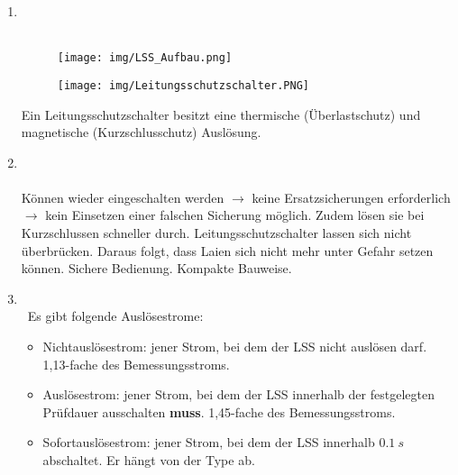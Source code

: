 \begin{enumerate}
    \clearpage


    \item   {}\\\\

            \begin{figure}[!htp]
                \centering
                \texttt{[image: img/LSS\_Aufbau.png]}
            \end{figure}
            \begin{figure}[!htp]
                \centering
                \texttt{[image: img/Leitungsschutzschalter.PNG]}
            \end{figure}

            Ein Leitungsschutzschalter besitzt eine thermische (Überlastschutz) und magnetische (Kurzschlusschutz) Auslösung.

    \item   {} \\\\
            Können wieder eingeschalten werden $\rightarrow$ keine Ersatzsicherungen erforderlich $\rightarrow$ kein Einsetzen einer falschen Sicherung möglich. Zudem lösen sie bei Kurzschlussen schneller durch. Leitungsschutzschalter lassen sich nicht überbrücken.
            Daraus folgt, dass Laien sich nicht mehr unter Gefahr setzen können. Sichere Bedienung. Kompakte Bauweise.  

    \clearpage

    \item   {} \\\
            Es gibt folgende Auslösestrome:

            \begin{itemize}
                \item Nichtauslösestrom: jener Strom, bei dem der LSS nicht auslösen darf. 1,13-fache des Bemessungsstroms.
                \item Auslösestrom: jener Strom, bei dem der LSS innerhalb der festgelegten Prüfdauer ausschalten \textbf{muss}. 1,45-fache des Bemessungsstroms.
                \item Sofortauslösestrom: jener Strom, bei dem der LSS innerhalb $\SI{0.1}{s}$ abschaltet. Er hängt von der Type ab.
            \end{itemize}


\end{enumerate}
